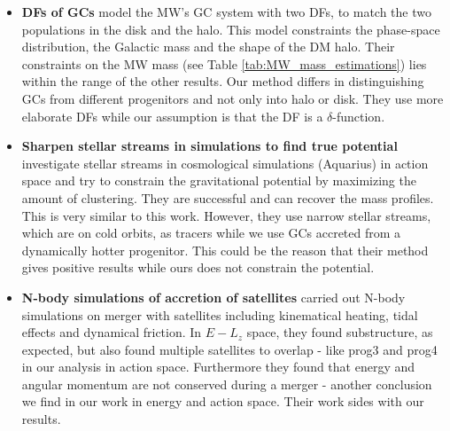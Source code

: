 \begin{itemize}
\item \textbf{\acp{DF} of \acp{GC}} \citet{Posti...MWmassGCs...2019} model the \ac{MW}'s \ac{GC} system with two \acp{DF}, to match the two populations in the disk and the halo. This model constraints the phase-space distribution, the Galactic mass and the shape of the \ac{DM} halo. Their constraints on the \ac{MW} mass (see Table \ref{tab:MW_mass_estimations}) lies within the range of the other results. Our method differs in distinguishing \acp{GC} from different progenitors and not only into halo or disk. They use more elaborate \acp{DF} while our assumption is that the \ac{DF} is a $\delta$-function.
\item \textbf{Sharpen stellar streams in simulations to find true potential} \citet{Sanderson...streams..adaptivedyn...2015, Sanderson...gravpotstreams...2017} investigate stellar streams in cosmological simulations (Aquarius) in action space and try to constrain the gravitational potential by maximizing the amount of clustering. They are successful and can recover the mass profiles. This is very similar to this work. However, they use narrow stellar streams, which are on cold orbits, as tracers while we use \acp{GC} accreted from a dynamically hotter progenitor. This could be the reason that their method gives positive results while ours does not constrain the potential.
\item \textbf{N-body simulations of accretion of satellites} \citet{Jean-Baptiste...accactionspace...2017} carried out N-body simulations on merger with satellites including kinematical heating, tidal effects and dynamical friction. In $E-L_z$ space, they found substructure, as expected, but also found multiple satellites to overlap - like prog3 and prog4 in our analysis in action space. Furthermore they found that energy and angular momentum are not conserved during a merger - another conclusion we find in our work in energy and action space. Their work sides with our results. 
\end{itemize}

